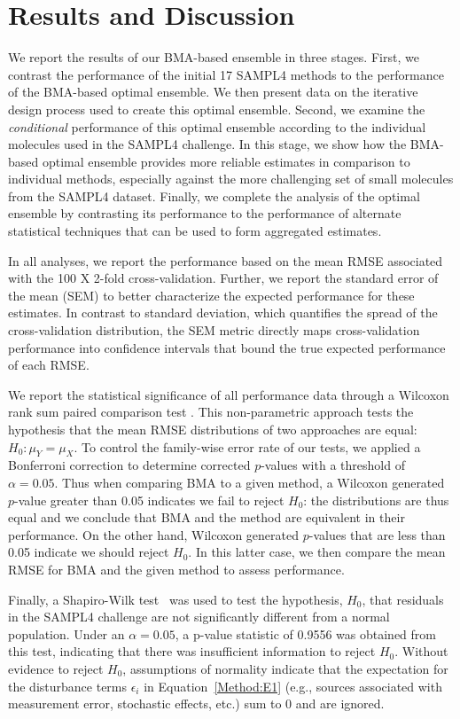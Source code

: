 \documentclass[journal=jpcbfk, manuscript=article]{achemso}
\newcommand{\+}[1]{\ensuremath{\mathbf{#1}}}
\begin{document}
\section{Results and Discussion} \label{Results}
We report the results of our BMA-based ensemble in three stages.
First, we contrast the performance of the initial 17 SAMPL4 methods to the performance of the BMA-based optimal ensemble.
We then present data on the iterative design process used to create this optimal ensemble.
Second, we examine the \emph{conditional} performance of this optimal ensemble according to the individual molecules used in the SAMPL4 challenge.
In this stage, we show how the BMA-based optimal ensemble provides more reliable estimates in comparison to individual methods, especially against the more challenging set of small molecules from the SAMPL4 dataset.
Finally, we complete the analysis of the optimal ensemble by contrasting its performance to the performance of alternate statistical techniques that can be used to form aggregated estimates. 

In all analyses, we report the performance based on the mean RMSE associated with the 100 X 2-fold cross-validation. 
Further, we report the standard error of the mean (SEM) to better characterize the expected performance for these estimates. 
In contrast to standard deviation, which quantifies the spread of the cross-validation distribution, the SEM metric directly maps cross-validation performance into confidence intervals that bound the true expected performance of each RMSE. 
 
We report the statistical significance of all performance data through a Wilcoxon rank sum paired comparison test \cite{Wilcoxon:45}.
This non-parametric approach tests the hypothesis that the mean RMSE distributions of two approaches are equal: $H_0 : \mu_Y = \mu_X$.
To control the family-wise error rate of our tests, we applied a Bonferroni correction to determine corrected $p$-values with a threshold of $\alpha = 0.05$.
Thus when comparing BMA to a given method, a Wilcoxon generated $p$-value greater than 0.05 indicates we fail to reject $H_0$: the distributions are thus equal and we conclude that BMA and the method are equivalent in their performance.
On the other hand, Wilcoxon generated $p$-values that are less than 0.05 indicate we should reject $H_0$.
In this latter case, we then compare the mean RMSE for BMA and the given method to assess performance.

Finally, a Shapiro-Wilk test~\cite{Shapiro:65} was used to test the hypothesis, $H_{0}$, that residuals in the SAMPL4 challenge are not significantly different from a normal population.
Under an $\alpha = 0.05$, a p-value statistic of 0.9556 was obtained from this test, indicating that there was insufficient information to reject $H_{0}$. 
Without evidence to reject $H_{0}$, assumptions of normality indicate that the expectation for the disturbance terms $\epsilon_i$ in Equation~\ref{Method:E1} (e.g., sources associated with measurement error, stochastic effects, etc.) sum to 0 and are ignored.
\end{document}
